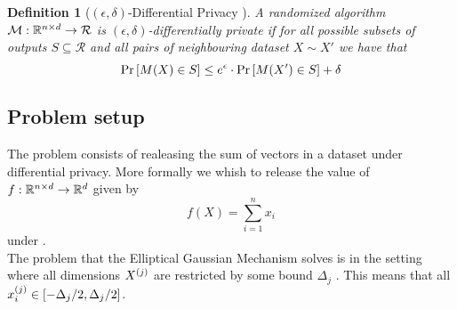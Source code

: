 \documentclass[a4paper,12pt]{article}
\newtheorem{definition}{Definition}[section]
\begin{document}
\vspace*{0.3cm}
\begin{definition}[$(\epsilon, \delta)$-Differential Privacy \cite{dwork2016}]
A randomized algorithm $\mathcal{M}: \mathbb{R}^{n \times d} \rightarrow \mathcal{R}$ 
is $(\epsilon, \delta)$-differentially private if for all possible 
subsets of outputs $S \subseteq \mathcal{R}$ and all pairs of 
neighbouring dataset $X \sim X'$ we have that
\[ \textnormal{Pr}\left [M(X) \in S \right] \le e^{\epsilon} \cdot \textnormal{Pr}\left [M(X') \in S \right] + \delta \]

    
\end{definition}



\subsection{Problem setup}
The problem consists of realeasing the sum of vectors 
in a dataset under differential privacy.
More formally we whish to release the value of 
$f:\mathbb{R}^{n \times d} \rightarrow  \mathbb{R}^d$ given by
\[ f(X) = \sum_{i = 1}^n x_i  \] 
under \edp. \\
The problem that the Elliptical Gaussian Mechanism solves 
is in the setting where all dimensions $X^{(j)}$ are restricted
by some bound $\Delta_j$ \cite{Lebeda2022}. This means that all 
$ x^{(j)}_i \in \left [-\Delta_j/2, \Delta_j/2 \right] $.


{}

\end{document}
